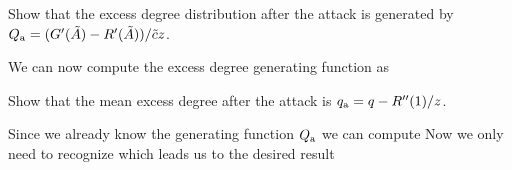 \subquestion Show that the excess degree distribution after the attack is generated by $Q_{\rm a}=(G'(\tilde{A})-R'(\tilde{A}))/\tilde{c}z$.

\solution
We can now compute the excess degree generating function as 

\subquestion Show that the mean excess degree after the attack is
$q_{\rm a}=q-R''(1)/z$.

\solution 
Since we already know the generating function $Q_{\rm a}$ we can compute 
Now we only need to recognize
which leads us to the desired result
